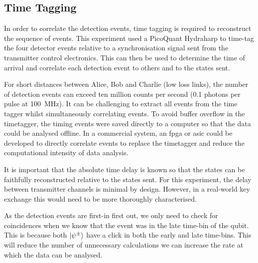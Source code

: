 
\subsection{Time Tagging}

In order to correlate the detection events, time tagging is required to reconstruct the sequence of events. This experiment used a PicoQuant Hydraharp to time-tag the four detector events relative to a synchronisation signal sent from the transmitter control electronics. This can then be used to determine the time of arrival and correlate each detection event to others and to the states sent.

For short distances between Alice, Bob and Charlie (low loss links), the number of detection events can exceed ten million counts per second (0.1 photons per pulse at \SI{100}{MHz}). It can be challenging to extract all events from the time tagger whilst simultaneously correlating events. To avoid buffer overflow in the timetagger, the timing events were saved directly to a computer so that the data could be analysed offline. In a commercial system, an \ac{fpga} or \ac{asic} could be developed to directly correlate events to replace the timetagger and reduce the computational intensity of data analysis. 

It is important that the absolute time delay is known so that the states can be faithfully reconstructed relative to the states sent. For this experiment, the delay between transmitter channels is minimal by design. However, in a real-world key exchange this would need to be more thoroughly characterised. 

As the detection events are first-in first out, we only need to check for coincidences when we know that the event was in the late time-bin of the qubit. This is because both $\ket{\psi^\pm}$ have a click in both the early and late time-bins. This will reduce the number of unnecessary calculations we can increase the rate at which the data can be analysed.

%

